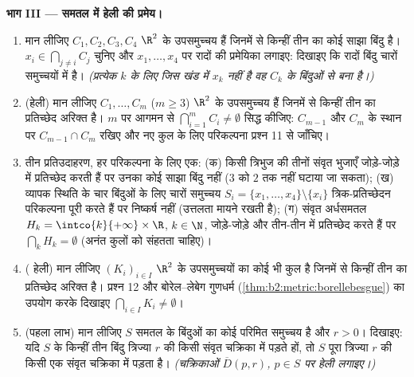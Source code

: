 \begin{problem}
\medskip
\noindent\textbf{भाग III --- समतल में हेली की प्रमेय।}
\begin{enumerate}[resume]
  \item मान लीजिए $C_1, C_2, C_3, C_4$ $\R^2$ के  उपसमुच्चय हैं जिनमें से किन्हीं तीन का
        कोई साझा बिंदु है। $x_i \in
        \bigcap_{j \neq i} C_j$ चुनिए और $x_1, \dots, x_4$ पर रादों की प्रमेयिका लगाइए:
        दिखाइए कि रादों बिंदु चारों समुच्चयों में है। \emph{(प्रत्येक $k$
        के लिए जिस खंड में $x_k$ नहीं है वह $C_k$ के बिंदुओं से बना है।)}
  \item (हेली) मान लीजिए $C_1, \dots, C_m$ ($m \geq 3$) $\R^2$ के  उपसमुच्चय हैं जिनमें से
        किन्हीं तीन का प्रतिच्छेद अरिक्त है। $m$ पर आगमन से $\bigcap_{i=1}^m C_i \neq \emptyset$ सिद्ध
        कीजिए: $C_{m-1}$ और $C_m$ के स्थान पर $C_{m-1} \cap C_m$ रखिए और नए कुल के लिए
        परिकल्पना प्रश्न 11 से जाँचिए।
  \item तीन प्रतिउदाहरण, हर परिकल्पना के लिए एक: (क) किसी त्रिभुज की तीनों
        संवृत भुजाएँ जोड़े-जोड़े में प्रतिच्छेद करती हैं पर उनका कोई साझा
        बिंदु नहीं ($3$ को $2$ तक नहीं घटाया जा सकता); (ख) व्यापक
        स्थिति के चार बिंदुओं के लिए चारों समुच्चय $S_i = \{x_1, \dots, x_4\}
        \setminus \{x_i\}$ त्रिक-प्रतिच्छेदन
        परिकल्पना पूरी करते हैं पर निष्कर्ष नहीं (उत्तलता मायने रखती है);
        (ग) संवृत अर्धसमतल $H_k = \intco{k}{+\infty} \times
        \R$, $k \in \N$, जोड़े-जोड़े और तीन-तीन में
        प्रतिच्छेद करते हैं पर $\bigcap_k H_k = \emptyset$ (अनंत कुलों को संहतता चाहिए)।
  \item ( हेली) मान लीजिए $(K_i)_{i \in I}$ $\R^2$ के   उपसमुच्चयों का कोई
        भी कुल है जिनमें से किन्हीं तीन का प्रतिच्छेद अरिक्त है। प्रश्न 12
        और बोरेल--लेबेग गुणधर्म (\cref{thm:b2:metric:borellebesgue}) का उपयोग करके दिखाइए $\bigcap_{i \in I} K_i \neq \emptyset$।
  \item (पहला लाभ) मान लीजिए $S$ समतल के बिंदुओं का कोई परिमित समुच्चय है
        और $r > 0$। दिखाइए: यदि $S$ के किन्हीं तीन बिंदु त्रिज्या $r$ की
        किसी संवृत चक्रिका में पड़ते हों, तो $S$ पूरा त्रिज्या $r$ की
        किसी एक संवृत चक्रिका में पड़ता है। \emph{(चक्रिकाओं $\overline D(p, r)$, $p \in S$ पर
        हेली लगाइए।)}
\end{enumerate}


\end{problem}
